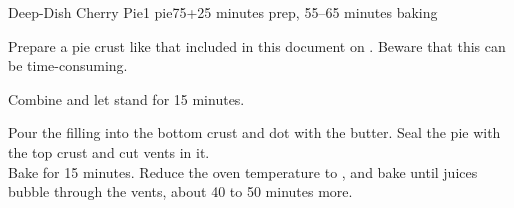 \documentclass[../Cookbook.tex]{subfiles}
\begin{document}
\begin{recipe}{Deep-Dish Cherry Pie}{1 pie}{75+25 minutes prep, 55--65 minutes baking}

	Prepare a pie crust like that included in this document on . Beware that this can be time-consuming.

	\newstep

	Combine and let stand for 15 minutes.

	Pour the filling into the bottom crust and dot with the butter. Seal the pie with the top crust and cut vents in it.\\
	Bake for 15 minutes.
	Reduce the oven temperature to , and bake until juices bubble through the vents, about 40 to 50 minutes more.

\end{recipe}
\end{document}
